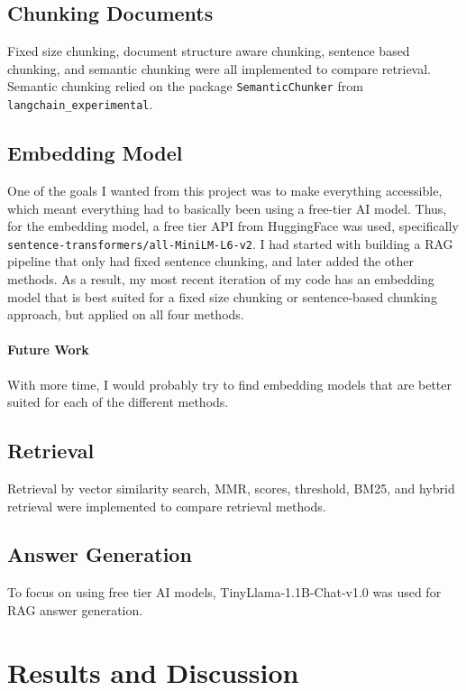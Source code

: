\documentclass{article}
\begin{document}
\subsection{Chunking Documents}
Fixed size chunking, document structure aware chunking, sentence based chunking, and semantic chunking were all implemented to compare retrieval. 
Semantic chunking relied on the package \texttt{SemanticChunker} from \texttt{langchain\_experimental}. 

\subsection{Embedding Model}
One of the goals I wanted from this project was to make everything accessible, which meant everything had to basically been using a free-tier AI model. 
Thus, for the embedding model, a free tier API from HuggingFace was used, specifically \texttt{sentence-transformers/all-MiniLM-L6-v2}. 
I had started with building a RAG pipeline that only had fixed sentence chunking, and later added the other methods. 
As a result, my most recent iteration of my code has an embedding model that is best suited for a fixed size chunking or sentence-based chunking approach, but applied on all four methods. 
\paragraph{Future Work} With more time, I would probably try to find embedding models that are better suited for each of the different methods. 

\subsection{Retrieval}
Retrieval by vector similarity search, MMR, scores, threshold, BM25, and hybrid retrieval were implemented to compare retrieval methods. 

\subsection{Answer Generation}
To focus on using free tier AI models, TinyLlama-1.1B-Chat-v1.0 was used for RAG answer generation. 

\section{Results and Discussion}
\end{document}
